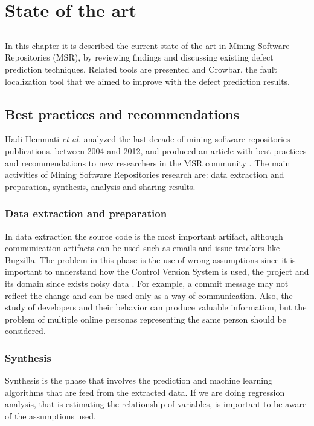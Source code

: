 \chapter{State of the art} \label{chap:sota}

\section*{}
In this chapter it is described the current state of the art in Mining Software Repositories (MSR), by reviewing findings and discussing existing defect prediction techniques. Related tools are presented and Crowbar, the fault localization tool that we aimed to improve with the defect prediction results.

\section{Best practices and recommendations}
Hadi Hemmati \textit{et al.} analyzed the last decade of mining software repositories publications, between 2004 and 2012, and produced an article with best practices and recommendations to new researchers in the MSR community \cite{Hemmati2013}. The main activities of Mining Software Repositories research are: data extraction and preparation, synthesis, analysis and sharing results.

\subsection{Data extraction and preparation}
In data extraction the source code is the most important artifact, although communication artifacts can be used such as emails and issue trackers like Bugzilla. The problem in this phase is the use of wrong assumptions since it is important to understand how the Control Version System is used, the project and its domain since exists noisy data \cite{herzig-tr-2012}. For example, a commit message may not reflect the change and can be used only as a way of communication. Also, the study of developers and their behavior can produce valuable information, but the problem of multiple online personas representing the same person should be considered. 

\subsection{Synthesis}
Synthesis is the phase that involves the prediction and machine learning algorithms that are feed from the extracted data. If we are doing regression analysis, that is estimating the relationship of variables, is important to be aware of the assumptions used. 

